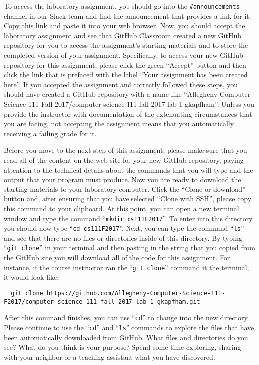 \documentclass[11pt]{article}
\newcommand{\command}[1]{``\lstinline{#1}''}
\begin{document}
To access the laboratory assignment, you should go into the {\tt \#announcements} channel in our Slack team and find the
announcement that provides a link for it. Copy this link and paste it into your web browser. Now, you should accept the
laboratory assignment and see that GitHub Classroom created a new GitHub repository for you to access the assignment's
starting materials and to store the completed version of your assignment. Specifically, to access your new GitHub
repository for this assignment, please click the green ``Accept'' button and then click the link that is prefaced with
the label ``Your assignment has been created here''. If you accepted the assignment and correctly followed these steps,
you should have created a GitHub repository with a name like
``Allegheny-Computer-Science-111-Fall-2017/computer-science-111-fall-2017-lab-1-gkapfham''. Unless you provide the
instructor with documentation of the extenuating circumstances that you are facing, not accepting the assignment means
that you automatically receiving a failing grade for it.

Before you move to the next step of this assignment, please make sure that you read all of the content on the web site
for your new GitHub repository, paying attention to the technical details about the commands that you will type and the
output that your program must produce. Now you are ready to download the starting materials to your laboratory computer.
Click the ``Clone or download'' button and, after ensuring that you have selected ``Clone with SSH'', please copy this
command to your clipboard. At this point, you can open a new terminal window and type the command \command{mkdir
cs111F2017}. To enter into this directory you should now type \command{cd cs111F2017}. Next, you can type the command
\command{ls} and see that there are no files or directories inside of this directory. By typing \command{git clone} in
your terminal and then pasting in the string that you copied from the GitHub site you will download all of the code for
this assignment. For instance, if the course instructor ran the \command{git clone} command it the terminal, it would
look like:

\begin{lstlisting}
  git clone https://github.com/Allegheny-Computer-Science-111-F2017/computer-science-111-fall-2017-lab-1-gkapfham.git
\end{lstlisting}

After this command finishes, you can use \command{cd} to change into the new directory. Please continue to use the
\command{cd} and \command{ls} commands to explore the files that have been automatically downloaded from GitHub. What
files and directories do you see? What do you think is your purpose? Spend some time exploring, sharing with your
neighbor or a teaching assistant what you have discovered.
\end{document}
